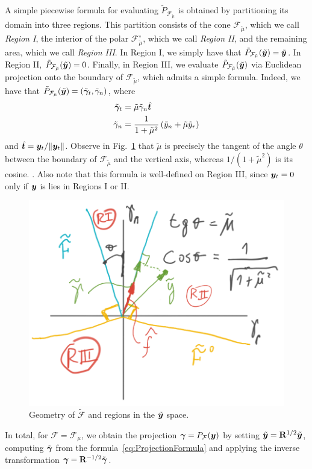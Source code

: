 A simple piecewise formula for evaluating $\tilde{P}_\mathcal{F_{\tilde\mu}}$ 
is obtained by partitioning its domain  into three regions.
This partition consists of the cone $\mathcal{F}_{\tilde\mu}$, which we call \textit{Region I},
the interior of the polar $\mathcal{F}_{\tilde\mu}^\circ$, which we call \textit{Region II},
and the remaining area, which we call \textit{Region III}.
In Region I, we simply have that $\tilde P_\mathcal{F_{\tilde\mu}}(\tilde{{\bm{y}}}) = \tilde{{\bm{y}}}$.
In Region II, $\tilde P_\mathcal{F_{\tilde\mu}}(\tilde{{\bm{y}}}) = 0$.
Finally, in Region III, we evaluate $\tilde P_\mathcal{F_{\tilde\mu}}(\tilde{{\bm{y}}})$
via Euclidean projection onto the boundary of $\mathcal{F}_{\tilde\mu}$,
which admits a simple formula. 
Indeed, we have that 
$\tilde P_\mathcal{F_{\tilde\mu}}(\tilde{{\bm{y}}}) = (\tilde{{\bm\gamma}}_t, \tilde{\gamma}_n)$,
where
\begin{align}\label{eq:ProjectionFormula}
\begin{aligned}
  \tilde{\bgamma}_t       &= \tilde{\mu}\tilde{\gamma}_n\hat{\vf{t}}\\
        \tilde{\gamma}_n  &= \frac{1}{1+\tilde{\mu}^2}\left(\tilde{y}_n +
	\tilde{\mu}\tilde{y}_r\right)
\end{aligned}
\end{align}
and $\hat{{\bm{t}}}={\bm{y}}_t/\Vert{\bm{y}}_t\Vert$. 
Observe in Fig.~\ref{fig:cone_regions} that  $\tilde\mu$ is precisely the tangent of the angle $\theta$ between the boundary 
of $\mathcal{F}_{\tilde\mu}$ and the vertical axis,
whereas $1/(1+\tilde\mu^2)$ is its cosine. . Also
note that this formula is well-defined on Region III,
since ${\bm{y}}_t = 0$ only if ${\bm{y}}$ is
lies in Regions I or II.
\begin{figure}[!h]
    \centering
    \includegraphics[width=0.45\columnwidth]{figures/cone_regions.png}
    \caption{Geometry of $\tilde{\mathcal{F}}$ and regions in the
    $\tilde{{\bm{y}}}$ space.}
    \label{fig:cone_regions}
\end{figure}
In total, for $\mathcal{F} = \mathcal{F}_{\mu}$, we obtain the projection ${\bm\gamma} = P_\mathcal{F}({\bm{y}})$  by setting 
$\tilde{{\bm{y}}} = {\mathbf{R}}^{1/2} \tilde{{\bm{y}}}$, computing $\tilde{{\bm\gamma}}$ from
the formula~\eqref{eq:ProjectionFormula} and applying the inverse transformation ${\bm\gamma}={\mathbf{R}}^{-1/2}\tilde{{\bm\gamma}}$.
